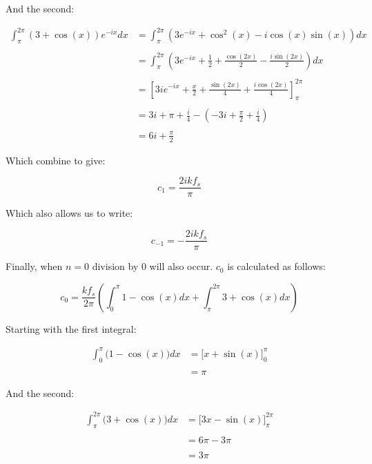 \begin{appendices}
		And the second:
		
		\begin{align}
			\int_{\pi}^{2\pi} (3+\cos(x))e^{-ix} dx & = 
				\int_{\pi}^{2\pi} \left( 3e^{-ix} + \cos^{2}(x) - 
				i\cos(x)\sin(x) \right) dx \nonumber \\
			\nonumber \\
			& = \int_{\pi}^{2\pi} \left( 3e^{-ix} + \frac{1}{2} + \frac{\cos(2x)}{2} - 
				\frac{i\sin(2x)}{2} \right) dx \nonumber \\
			\nonumber \\
			& = \left[ 3ie^{-ix} + \frac{x}{2} + \frac{\sin(2x)}{4} + 
				\frac{i\cos(2x)}{4} \right]_{\pi}^{2\pi} \nonumber \\
			\nonumber \\
			& = 3i + \pi + \frac{i}{4} - \left( -3i + \frac{\pi}{2} + \frac{i}{4} \right) \nonumber \\
			\nonumber \\
			& = 6i + \frac{\pi}{2} \nonumber
		\end{align}

		Which combine to give:

		\[ c_{1} = \frac{2ikf_{s}}{\pi} \]

		Which also allows us to write:

		\[ c_{-1} = -\frac{2ikf_{s}}{\pi} \]

		Finally, when $n = 0$ division by 0 will also occur. $c_{0}$ is calculated as follows:

		\[ c_{0} = \frac{kf_{s}}{2\pi} \left( \int_{0}^{\pi} 1-\cos(x) dx
						      + \int_{\pi}^{2\pi} 3 + \cos(x) dx 
						      \right) \]

		Starting with the first integral:

		\begin{align}
			\int_{0}^{\pi} \bigl( 1 - \cos(x) \bigr) dx & = 
				\biggl[ x + \sin(x) \biggr]_{0}^{\pi} \nonumber \\
			\nonumber \\
			& = \pi \nonumber
		\end{align}

		And the second:

		\begin{align}
			\int_{\pi}^{2\pi} \bigl( 3 + \cos(x) \bigr) dx & = 
				\biggl[ 3x - \sin(x) \biggr]_{\pi}^{2\pi} \nonumber \\
			\nonumber \\
			& = 6\pi - 3\pi \nonumber \\
			\nonumber \\
			& = 3\pi \nonumber
		\end{align}


\end{appendices}

